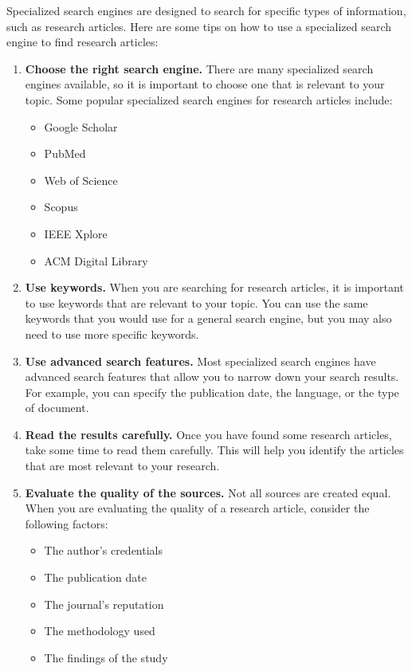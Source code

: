 \documentclass[
  b5paper]{book}
\begin{document}
Specialized search engines are designed to search for specific types of information, such as research articles. Here are some tips on how to use a specialized search engine to find research articles:

\begin{enumerate}
\def\labelenumi{\arabic{enumi}.}
\item
  \textbf{Choose the right search engine.} There are many specialized search engines available, so it is important to choose one that is relevant to your topic. Some popular specialized search engines for research articles include:

  \begin{itemize}
  \item
    Google Scholar
  \item
    PubMed
  \item
    Web of Science
  \item
    Scopus
  \item
    IEEE Xplore
  \item
    ACM Digital Library
  \end{itemize}
\item
  \textbf{Use keywords.} When you are searching for research articles, it is important to use keywords that are relevant to your topic. You can use the same keywords that you would use for a general search engine, but you may also need to use more specific keywords.
\item
  \textbf{Use advanced search features.} Most specialized search engines have advanced search features that allow you to narrow down your search results. For example, you can specify the publication date, the language, or the type of document.
\item
  \textbf{Read the results carefully.} Once you have found some research articles, take some time to read them carefully. This will help you identify the articles that are most relevant to your research.
\item
  \textbf{Evaluate the quality of the sources.} Not all sources are created equal. When you are evaluating the quality of a research article, consider the following factors:

  \begin{itemize}
  \item
    The author's credentials
  \item
    The publication date
  \item
    The journal's reputation
  \item
    The methodology used
  \item
    The findings of the study
  \end{itemize}
\end{enumerate}
\end{document}
